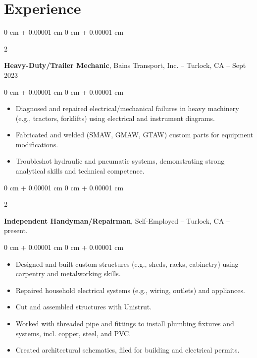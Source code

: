 \documentclass[10pt, letterpaper]{article}
\newenvironment{highlights}{
    \begin{itemize}[
        topsep=0.10 cm,
        parsep=0.10 cm,
        partopsep=0pt,
        itemsep=0pt,
        leftmargin=0 cm + 10pt
    ]
}{
    \end{itemize}
} %
\newenvironment{onecolentry}{
    \begin{adjustwidth}{
        0 cm + 0.00001 cm
    }{
        0 cm + 0.00001 cm
    }
}{
    \end{adjustwidth}
} %
\newenvironment{twocolentry}[2][]{
    \onecolentry
    \def\secondColumn{#2}
    \setcolumnwidth{\fill, 4.5 cm}
    \begin{paracol}{2}
}{
    \switchcolumn \raggedleft \secondColumn
    \end{paracol}
    \endonecolentry
} %
\begin{document}
    \section{Experience}

        \begin{twocolentry}{
            2016 – Sept 2023
        }
            \textbf{Heavy-Duty/Trailer Mechanic}, Bains Transport, Inc. -- Turlock, CA \end{twocolentry}

        \vspace{0.10 cm}
        \begin{onecolentry}
            \begin{highlights}
                \item Diagnosed and repaired electrical/mechanical failures in heavy machinery (e.g., tractors, forklifts) using electrical and instrument diagrams. 
                \item Fabricated and welded (SMAW, GMAW, GTAW) custom parts for equipment modifications. 
                \item Troubleshot hydraulic and pneumatic systems, demonstrating strong analytical skills and technical competence.
            \end{highlights}
        \end{onecolentry}

        \vspace{0.2 cm}

        \begin{twocolentry}{
            2018 – present.
        }
            \textbf{Independent Handyman/Repairman}, Self-Employed -- Turlock, CA \end{twocolentry}

        \vspace{0.10 cm}
        \begin{onecolentry}
            \begin{highlights}
                \item Designed and built custom structures (e.g., sheds, racks, cabinetry) using carpentry and metalworking skills.
                \item Repaired household electrical systems (e.g., wiring, outlets) and appliances.
                \item Cut and assembled structures with Unistrut.
                \item Worked with threaded pipe and fittings to install plumbing fixtures and systems, incl. copper, steel, and PVC.
                \item Created architectural schematics, filed for building and electrical permits. 
            \end{highlights}
        \end{onecolentry}
\end{document}
